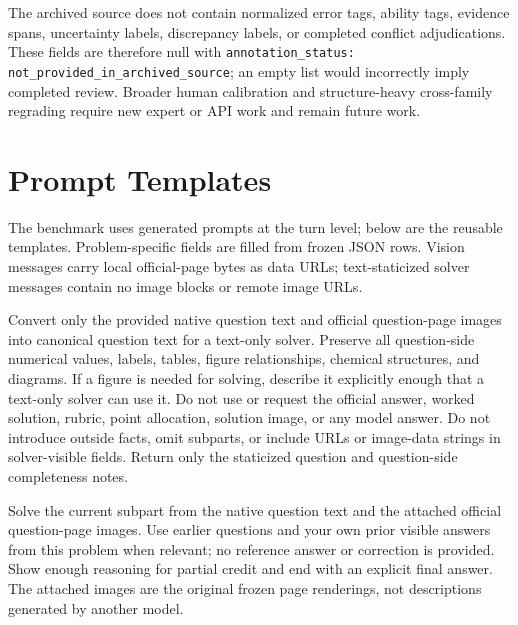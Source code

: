 \documentclass[11pt]{article}
\begin{document}
The archived source does not contain normalized error tags, ability tags, evidence spans, uncertainty labels, discrepancy labels, or completed conflict adjudications. These fields are therefore null with \texttt{annotation\_status: not\_provided\_in\_archived\_source}; an empty list would incorrectly imply completed review. Broader human calibration and structure-heavy cross-family regrading require new expert or API work and remain future work.

\section{Prompt Templates}
\label{app:prompts}
The benchmark uses generated prompts at the turn level; below are the reusable templates.
Problem-specific fields are filled from frozen JSON rows.
Vision messages carry local official-page bytes as data URLs; text-staticized solver messages contain no image blocks or remote image URLs.

\begin{tcolorbox}[
  title={Question-only staticization prompt},
  colback=gray!3,
  colframe=black!35,
  boxrule=0.6pt,
  arc=1.5mm,
  left=1.5mm,right=1.5mm,top=1mm,bottom=1mm
]
\footnotesize
Convert only the provided native question text and official question-page images into canonical question text for a text-only solver.
Preserve all question-side numerical values, labels, tables, figure relationships, chemical structures, and diagrams.
If a figure is needed for solving, describe it explicitly enough that a text-only solver can use it.
Do not use or request the official answer, worked solution, rubric, point allocation, solution image, or any model answer.
Do not introduce outside facts, omit subparts, or include URLs or image-data strings in solver-visible fields.
Return only the staticized question and question-side completeness notes.
\end{tcolorbox}

\begin{tcolorbox}[
  title={Vision interleaved solver prompt},
  colback=gray!3,
  colframe=black!35,
  boxrule=0.6pt,
  arc=1.5mm,
  left=1.5mm,right=1.5mm,top=1mm,bottom=1mm
]
\footnotesize
Solve the current subpart from the native question text and the attached official question-page images.
Use earlier questions and your own prior visible answers from this problem when relevant; no reference answer or correction is provided.
Show enough reasoning for partial credit and end with an explicit final answer.
The attached images are the original frozen page renderings, not descriptions generated by another model.
\end{tcolorbox}
\end{document}
